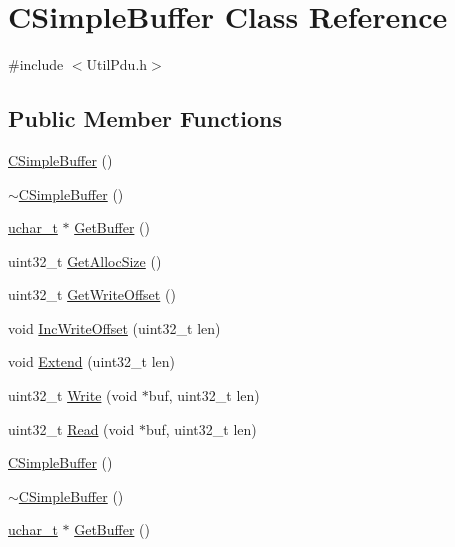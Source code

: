 \hypertarget{class_c_simple_buffer}{}\section{C\+Simple\+Buffer Class Reference}
\label{class_c_simple_buffer}


{\ttfamily \#include $<$Util\+Pdu.\+h$>$}

\subsection*{Public Member Functions}
\begin{DoxyCompactItemize}
\item 
\hyperlink{class_c_simple_buffer_a99803d2d5a799d082272394a984f84df}{C\+Simple\+Buffer} ()
\item 
\hyperlink{class_c_simple_buffer_af588bd4736db3776dcec88263848c302}{$\sim$\+C\+Simple\+Buffer} ()
\item 
\hyperlink{base_2ostype_8h_a124ea0f8f4a23a0a286b5582137f0b8d}{uchar\+\_\+t} $\ast$ \hyperlink{class_c_simple_buffer_a629a568183a187679405037915485466}{Get\+Buffer} ()
\item 
uint32\+\_\+t \hyperlink{class_c_simple_buffer_ab9d4b94a034d9ab267ae7974dc5e314c}{Get\+Alloc\+Size} ()
\item 
uint32\+\_\+t \hyperlink{class_c_simple_buffer_ae6eda90d981b7995517d30391d9f8249}{Get\+Write\+Offset} ()
\item 
void \hyperlink{class_c_simple_buffer_a8a7e604e0ef24323b8debb9b9a28da27}{Inc\+Write\+Offset} (uint32\+\_\+t len)
\item 
void \hyperlink{class_c_simple_buffer_a4a241562152da03a50fbc129019f37cf}{Extend} (uint32\+\_\+t len)
\item 
uint32\+\_\+t \hyperlink{class_c_simple_buffer_ae8b7f7472305585ca9eb2cf34b04e2ea}{Write} (void $\ast$buf, uint32\+\_\+t len)
\item 
uint32\+\_\+t \hyperlink{class_c_simple_buffer_a5fac9cec925fcc938fd830f240dfe06d}{Read} (void $\ast$buf, uint32\+\_\+t len)
\item 
\hyperlink{class_c_simple_buffer_a99803d2d5a799d082272394a984f84df}{C\+Simple\+Buffer} ()
\item 
\hyperlink{class_c_simple_buffer_af588bd4736db3776dcec88263848c302}{$\sim$\+C\+Simple\+Buffer} ()
\item 
\hyperlink{base_2ostype_8h_a124ea0f8f4a23a0a286b5582137f0b8d}{uchar\+\_\+t} $\ast$ \hyperlink{class_c_simple_buffer_a629a568183a187679405037915485466}{Get\+Buffer} ()

\end{DoxyCompactItemize}
